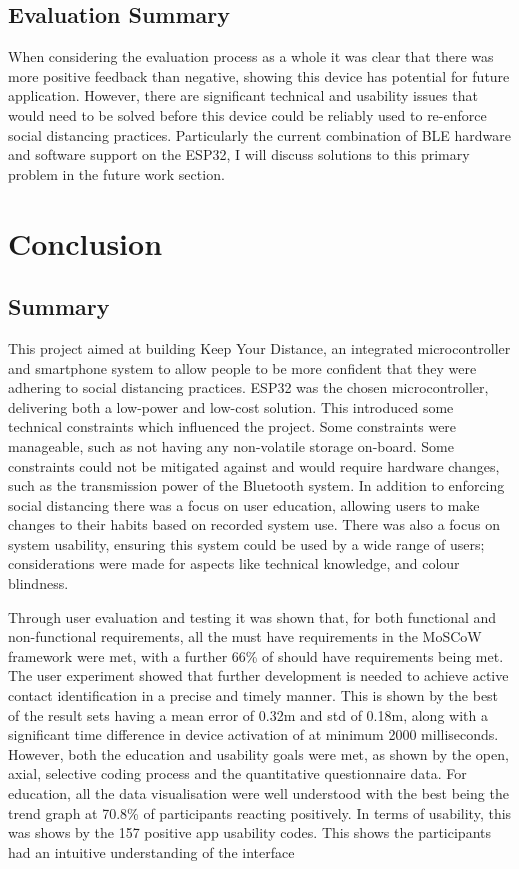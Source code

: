 \documentclass{l4proj}
\begin{document}
\section{Evaluation Summary}

When considering the evaluation process as a whole it was clear that there was more positive feedback than negative, showing this device has potential for future application. However, there are significant technical and usability issues that would need to be solved before this device could be reliably used to re-enforce social distancing practices. Particularly the current combination of BLE hardware and software support on the ESP32, I will discuss solutions to this primary problem in the future work section.

\chapter{Conclusion}

\section{Summary}

This project aimed at building Keep Your Distance, an integrated microcontroller and smartphone system to allow people to be more confident that they were adhering to social distancing practices. ESP32 was the chosen microcontroller, delivering both a low-power and low-cost solution. This introduced some technical constraints which influenced the project. Some constraints were manageable, such as not having any non-volatile storage on-board. Some constraints could not be mitigated against and would require hardware changes, such as the transmission power of the Bluetooth system. In addition to enforcing social distancing there was a focus on user education, allowing users to make changes to their habits based on recorded system use. There was also a focus on system usability, ensuring this system could be used by a wide range of users; considerations were made for aspects like technical knowledge, and colour blindness.

Through user evaluation and testing it was shown that, for both functional and non-functional requirements, all the must have requirements in the MoSCoW framework were met, with a further 66\% of should have requirements being met. The user experiment showed that further development is needed to achieve active contact identification in a precise and timely manner. This is shown by the best of the result sets having a mean error of 0.32m and std of 0.18m, along with a significant time difference in device activation of at minimum 2000 milliseconds. However, both the education and usability goals were met, as shown by the open, axial, selective coding process and the quantitative questionnaire data. For education, all the data visualisation were well understood with the best being the trend graph at 70.8\% of participants reacting positively. In terms of usability, this was shows by the 157 positive app usability codes. This shows the participants had an intuitive understanding of the interface
\end{document}
